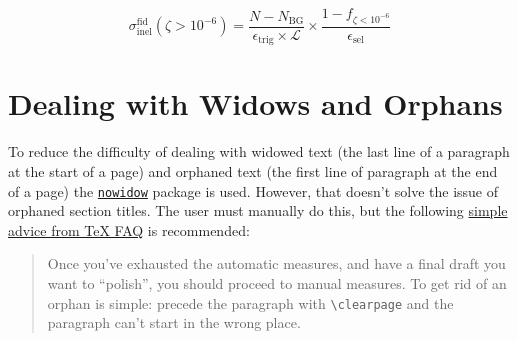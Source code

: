 \begin{equation}
 \sigma_{\mathrm{inel}}^{\mathrm{fid}} \left(\zeta > 10^{-6}\right) = \frac{N - N_{\mathrm{BG}}}{\epsilon_{\mathrm{trig}} \times \mathcal{L}} \times \frac{1 - f_{\zeta < 10^{-6}}}{\epsilon_{\mathrm{sel}}}
 \label{eq:fiducial_cross_section}
\end{equation}

\section{Dealing with Widows and Orphans}

To reduce the difficulty of dealing with widowed text (the last line of a paragraph at the start of a page) and orphaned text (the first line of paragraph at the end of a page) the \href{https://ctan.org/pkg/nowidow?lang=en}{\texttt{nowidow}} package is used.
However, that doesn't solve the issue of orphaned section titles.
The user must manually do this, but the following \href{https://texfaq.org/FAQ-widows}{simple advice from \TeX{} FAQ} is recommended:

\begin{quote}
 Once you've exhausted the automatic measures, and have a final draft you want to ``polish'', you should proceed to manual measures.
 To get rid of an orphan is simple: precede the paragraph with \texttt{\textbackslash clearpage} and the paragraph can’t start in the wrong place.
\end{quote}
